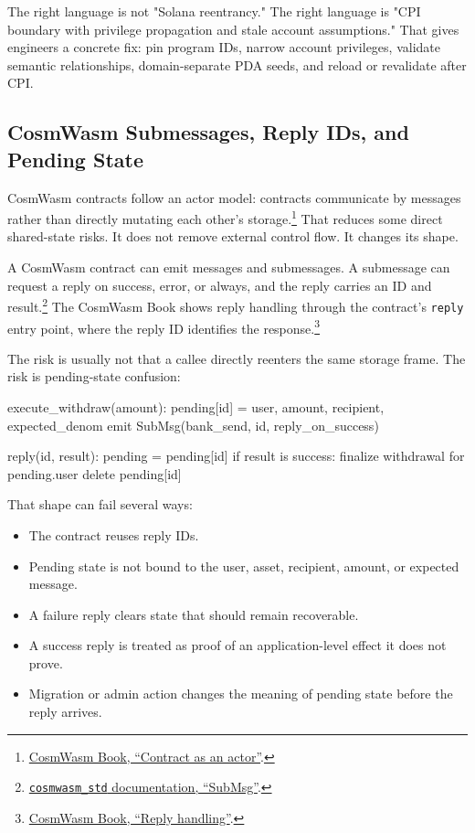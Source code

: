 The right language is not "Solana reentrancy." The right language is "CPI boundary with privilege propagation and stale account assumptions." That gives engineers a concrete fix: pin program IDs, narrow account privileges, validate semantic relationships, domain-separate PDA seeds, and reload or revalidate after CPI.

\subsection{CosmWasm Submessages, Reply IDs, and Pending State}

CosmWasm contracts follow an actor model: contracts communicate by messages rather than directly mutating each other's storage.\footnote{\href{https://book.cosmwasm.com/actor-model/contract-as-actor.html}{CosmWasm Book, ``Contract as an actor''}.} That reduces some direct shared-state risks. It does not remove external control flow. It changes its shape.

A CosmWasm contract can emit messages and submessages. A submessage can request a reply on success, error, or always, and the reply carries an ID and result.\footnote{\href{https://docs.rs/cosmwasm-std/latest/cosmwasm_std/struct.SubMsg.html}{\texttt{cosmwasm\_std} documentation, ``SubMsg''}.} The CosmWasm Book shows reply handling through the contract's \texttt{reply} entry point, where the reply ID identifies the response.\footnote{\href{https://book.cosmwasm.com/actor-model/contract-as-actor.html\#reply-handling}{CosmWasm Book, ``Reply handling''}.}

The risk is usually not that a callee directly reenters the same storage frame. The risk is pending-state confusion:

\begin{codeblock}
execute_withdraw(amount):
    pending[id] = {
        user,
        amount,
        recipient,
        expected_denom
    }
    emit SubMsg(bank_send, id, reply_on_success)

reply(id, result):
    pending = pending[id]
    if result is success:
        finalize withdrawal for pending.user
    delete pending[id]
\end{codeblock}

That shape can fail several ways:

\begin{itemize}
\item The contract reuses reply IDs.
\item Pending state is not bound to the user, asset, recipient, amount, or expected message.
\item A failure reply clears state that should remain recoverable.
\item A success reply is treated as proof of an application-level effect it does not prove.
\item Migration or admin action changes the meaning of pending state before the reply arrives.
\end{itemize}


